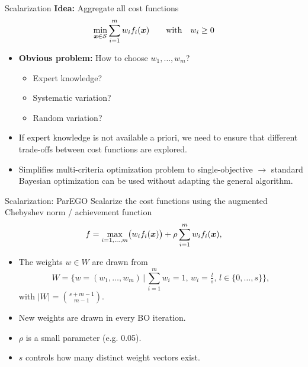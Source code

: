 \documentclass[11pt,compress,t,notes=noshow,xcolor=table]{beamer}
\begin{document}
\begin{framev}{Scalarization}
\textbf{Idea:} Aggregate all cost functions
$$
\min_{\xv \in \S} \sum_{i = 1}^m w_i \fkx[i]
\quad\quad
\text{with} \quad w_i \ge 0
$$
\begin{itemize}
\item \textbf{Obvious problem:} How to choose $w_1, \dots, w_m$?
\begin{itemize}
\item Expert knowledge?
\item Systematic variation?
\item Random variation?
\end{itemize}
\item If expert knowledge is not available a priori, we need to ensure that 
different trade-offs between cost functions are explored.
\item Simplifies multi-criteria optimization problem to single-objective 
$\longrightarrow$ standard Bayesian optimization can be used without 
adapting the general algorithm.
\end{itemize}
\end{framev}


\begin{framev}{Scalarization: ParEGO}
Scalarize the cost functions using the augmented Chebyshev norm / achievement function
$$
f = \max_{i=1,\dots,m}\bigl(w_i \fkx[i]\bigr) 
+ \rho \sum_{i=1}^m w_i \fkx[i],
$$
\begin{itemize}
\item The weights $w \in W$ are drawn from
$$
W = 
\bigl\{ w = (w_1, \dots, w_m) \,\big|\,
\sum_{i=1}^m w_i = 1,\, w_i = \tfrac{l}{s},\, l \in \{0,\dots,s\}
\bigr\},
$$
with $\lvert W \rvert = \binom{s+m-1}{m-1}$.
\item New weights are drawn in every BO iteration.
\item $\rho$ is a small parameter (e.g. 0.05).
\item $s$ controls how many distinct weight vectors exist.
\end{itemize}
\end{framev}
\end{document}
